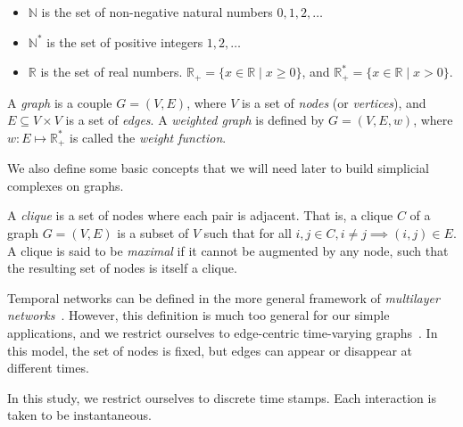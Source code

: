 \documentclass[a4paper,11pt,openany,extrafontsizes]{memoir}
\begin{document}
\begin{notation}
  \begin{itemize}
  \item $\mathbb{N}$ is the set of non-negative natural numbers
    $0,1,2,\ldots$ 
  \item $\mathbb{N}^*$ is the set of positive integers $1,2,\ldots$
  \item $\mathbb{R}$ is the set of real numbers.
    $\mathbb{R}_+ = \{x\in\mathbb{R} \;|\; x\geq 0\}$, and
    $\mathbb{R}_+^* = \{x\in\mathbb{R} \;|\; x>0\}$.
\end{itemize}
\end{notation}

\begin{defn}[Graph]
  A \emph{graph} is a couple $G = (V, E)$, where $V$ is a set of
  \emph{nodes} (or \emph{vertices}), and $E \subseteq V\times V$ is a
  set of \emph{edges}. A \emph{weighted graph} is defined by
  $G = (V, E, w)$, where $w : E\mapsto \mathbb{R}_+^*$ is called the
  \emph{weight function}.
\end{defn}

We also define some basic concepts that we will need later to build
simplicial complexes on graphs.

\begin{defn}[Clique]
  A \emph{clique} is a set of nodes where each pair is adjacent. That
  is, a clique $C$ of a graph $G = (V,E)$ is a subset of $V$ such that
  for all $i,j\in C, i \neq j \implies (i,j)\in E$. A clique is said
  to be \emph{maximal} if it cannot be augmented by any node, such
  that the resulting set of nodes is itself a clique.
\end{defn}

Temporal networks can be defined in the more general framework of
\emph{multilayer networks}~\cite{kivela_multilayer_2014}. However,
this definition is much too general for our simple applications, and
we restrict ourselves to edge-centric time-varying
graphs~\cite{casteigts_time-varying_2012}. In this model, the set of
nodes is fixed, but edges can appear or disappear at different times.

In this study, we restrict ourselves to discrete time stamps. Each
interaction is taken to be instantaneous.
\end{document}
